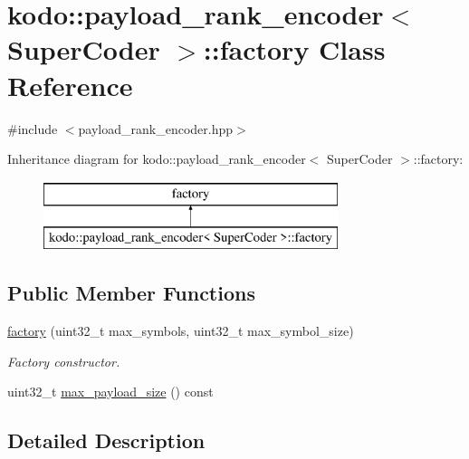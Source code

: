 \hypertarget{classkodo_1_1payload__rank__encoder_1_1factory}{\section{kodo\-:\-:payload\-\_\-rank\-\_\-encoder$<$ Super\-Coder $>$\-:\-:factory Class Reference}
\label{classkodo_1_1payload__rank__encoder_1_1factory}
}


{\ttfamily \#include $<$payload\-\_\-rank\-\_\-encoder.\-hpp$>$}

Inheritance diagram for kodo\-:\-:payload\-\_\-rank\-\_\-encoder$<$ Super\-Coder $>$\-:\-:factory\-:\begin{figure}[H]
\begin{center}
\leavevmode
\includegraphics[height=2.000000cm]{classkodo_1_1payload__rank__encoder_1_1factory}
\end{center}
\end{figure}
\subsection*{Public Member Functions}
\begin{DoxyCompactItemize}
\item 
\hyperlink{classkodo_1_1payload__rank__encoder_1_1factory_af4731cb23db84274c89efb5f27984419}{factory} (uint32\-\_\-t max\-\_\-symbols, uint32\-\_\-t max\-\_\-symbol\-\_\-size)
\begin{DoxyCompactList}\small\item\em Factory constructor. \end{DoxyCompactList}\item 
uint32\-\_\-t \hyperlink{classkodo_1_1payload__rank__encoder_1_1factory_a919bed670b3f0e5429af5e5bd036642d}{max\-\_\-payload\-\_\-size} () const 
\begin{DoxyCompactList}\small\item\em \end{DoxyCompactList}\end{DoxyCompactItemize}


\subsection{Detailed Description}
